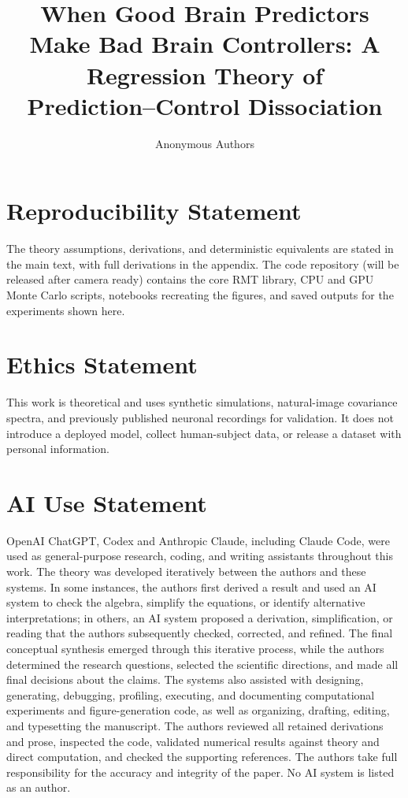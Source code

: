 \documentclass{article}
\title{When Good Brain Predictors Make Bad Brain Controllers: A Regression Theory of \\Prediction–Control Dissociation}
\author{Anonymous Authors}
\theoremstyle{plain}
\theoremstyle{definition}
\theoremstyle{remark}
\begin{document}
\maketitle
% 

\clearpage
\section{Reproducibility Statement}
The theory assumptions, derivations, and deterministic equivalents are stated in the main text, with full derivations in the appendix. The code repository (will be released after camera ready) contains the core RMT library, CPU and GPU Monte Carlo scripts, notebooks recreating the figures, and saved outputs for the experiments shown here.

\section{Ethics Statement}
This work is theoretical and uses synthetic simulations, natural-image covariance spectra, and previously published neuronal recordings for validation. It does not introduce a deployed model, collect human-subject data, or release a dataset with personal information.


\section*{AI Use Statement}
{OpenAI ChatGPT, Codex and Anthropic Claude, including Claude Code, were used as general-purpose research, coding, and writing assistants throughout this work. 
The theory was developed iteratively between the authors and these systems. In some instances, the authors first derived a result and used an AI system to check the algebra, simplify the equations, or identify alternative interpretations; in others, an AI system proposed a derivation, simplification, or reading that the authors subsequently checked, corrected, and refined. The final conceptual synthesis emerged through this iterative process, while the authors determined the research questions, selected the scientific directions, and made all final decisions about the claims. The systems also assisted with designing, generating, debugging, profiling, executing, and documenting computational experiments and figure-generation code, as well as organizing, drafting, editing, and typesetting the manuscript. The authors reviewed all retained derivations and prose, inspected the code, validated numerical results against theory and direct computation, and checked the supporting references. The authors take full responsibility for the accuracy and integrity of the paper. No AI system is listed as an author.}



\clearpage
\appendix
\tableofcontents{}
% 


\clearpage

\end{document}
